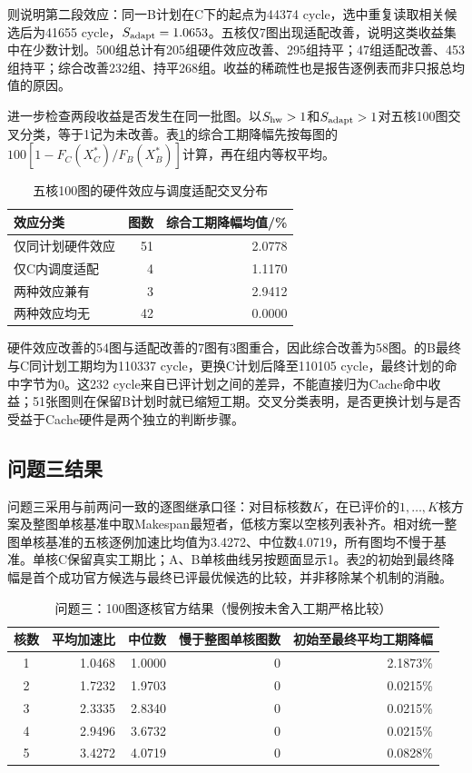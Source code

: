 则说明第二段效应：同一B计划在C下的起点为44374 cycle，选中重复读取相关候选后为41655 cycle，$S_{\rm adapt}=1.0653$。五核仅7图出现适配改善，说明这类收益集中在少数计划。500组总计有205组硬件效应改善、295组持平；47组适配改善、453组持平；综合改善232组、持平268组。收益的稀疏性也是报告逐例表而非只报总均值的原因。

进一步检查两段收益是否发生在同一批图。以$S_{\rm hw}>1$和$S_{\rm adapt}>1$对五核100图交叉分类，等于1记为未改善。表\ref{tab:c-effect-cross}的综合工期降幅先按每图的$100[1-F_C(X_C^*)/F_B(X_B^*)]$计算，再在组内等权平均。
\begin{table}[H]\centering\small
\caption{五核100图的硬件效应与调度适配交叉分布}
\label{tab:c-effect-cross}
\begin{tabular}{lrr}\toprule
效应分类 & 图数 & 综合工期降幅均值/\%\\\midrule
仅同计划硬件效应 & 51 & 2.0778\\
仅C内调度适配 & 4 & 1.1170\\
两种效应兼有 & 3 & 2.9412\\
两种效应均无 & 42 & 0.0000\\\bottomrule
\end{tabular}
\end{table}
硬件效应改善的54图与适配改善的7图有3图重合，因此综合改善为58图。的B最终与C同计划工期均为110337 cycle，更换C计划后降至110105 cycle，最终计划的命中字节为0。这232 cycle来自已评计划之间的差异，不能直接归为Cache命中收益；51张图则在保留B计划时就已缩短工期。交叉分类表明，是否更换计划与是否受益于Cache硬件是两个独立的判断步骤。

\subsection{问题三结果}
问题三采用与前两问一致的逐图继承口径：对目标核数$K$，在已评价的$1,\ldots,K$核方案及整图单核基准中取Makespan最短者，低核方案以空核列表补齐。相对统一整图单核基准的五核逐例加速比均值为3.4272、中位数4.0719，所有图均不慢于基准。单核C保留真实工期比；A、B单核曲线另按题面显示1。表\ref{tab:c-results}的初始到最终降幅是首个成功官方候选与最终已评最优候选的比较，并非移除某个机制的消融。
\begin{table}[H]\centering\caption{问题三：100图逐核官方结果（慢例按未舍入工期严格比较）}\label{tab:c-results}
\begin{tabular}{crrrr}\toprule
核数 & 平均加速比 & 中位数 & 慢于整图单核图数 & 初始至最终平均工期降幅\\\midrule
1 & 1.0468 & 1.0000 & 0 & 2.1873\%\\
2 & 1.7232 & 1.9703 & 0 & 0.0215\%\\
3 & 2.3335 & 2.8340 & 0 & 0.0215\%\\
4 & 2.9496 & 3.6732 & 0 & 0.0215\%\\
5 & 3.4272 & 4.0719 & 0 & 0.0828\%\\\bottomrule
\end{tabular}\end{table}

